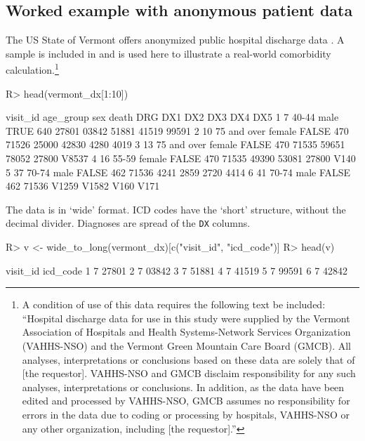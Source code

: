 \documentclass[article]{jss}
\begin{document}
\subsection{Worked example with anonymous patient
data}\label{worked-example-with-anonymous-patient-data}

The US State of Vermont offers anonymized public hospital discharge data
\citep{VermontDepartmentofHealth_VermontHospitalDischarge_2016}. A
sample is included in  and is used here to illustrate a
real-world comorbidity calculation.\footnote{A condition of use of this
  data requires the following text be included: ``Hospital discharge
  data for use in this study were supplied by the Vermont Association of
  Hospitals and Health Systems-Network Services Organization (VAHHS-NSO)
  and the Vermont Green Mountain Care Board (GMCB). All analyses,
  interpretations or conclusions based on these data are solely that of
  {[}the requestor{]}. VAHHS-NSO and GMCB disclaim responsibility for
  any such analyses, interpretations or conclusions. In addition, as the
  data have been edited and processed by VAHHS-NSO, GMCB assumes no
  responsibility for errors in the data due to coding or processing by
  hospitals, VAHHS-NSO or any other organization, including {[}the
  requestor{]}.''}

\begin{CodeChunk}

\begin{CodeInput}
R> head(vermont_dx[1:10])
\end{CodeInput}

\begin{CodeOutput}
  visit_id   age_group    sex death DRG   DX1   DX2   DX3   DX4   DX5
1        7       40-44   male  TRUE 640 27801 03842 51881 41519 99591
2       10 75 and over female FALSE 470 71526 25000 42830  4280  4019
3       13 75 and over female FALSE 470 71535 59651 78052 27800 V8537
4       16       55-59 female FALSE 470 71535 49390 53081 27800  V140
5       37       70-74   male FALSE 462 71536  4241  2859  2720  4414
6       41       70-74   male FALSE 462 71536 V1259 V1582  V160  V171
\end{CodeOutput}
\end{CodeChunk}

The data is in `wide' format. ICD codes have the `short' structure,
without the decimal divider. Diagnoses are spread of the \texttt{DX}
columns.

\begin{CodeChunk}

\begin{CodeInput}
R> v <- wide_to_long(vermont_dx)[c("visit_id", "icd_code")]
R> head(v)
\end{CodeInput}

\begin{CodeOutput}
  visit_id icd_code
1        7    27801
2        7    03842
3        7    51881
4        7    41519
5        7    99591
6        7    42842
\end{CodeOutput}
\end{CodeChunk}
\end{document}
